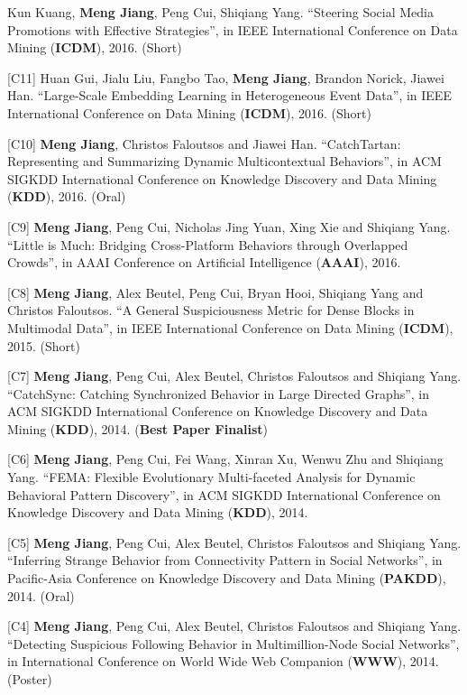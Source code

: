 \documentclass[margin, 9pt]{res}
\begin{document}
\begin{resume}
[C12] Kun Kuang, \textbf{Meng Jiang}, Peng Cui, Shiqiang Yang. ``Steering Social Media Promotions with Effective Strategies'', in IEEE International Conference on Data Mining (\textbf{ICDM}), 2016. (Short)

[C11] Huan Gui, Jialu Liu, Fangbo Tao, \textbf{Meng Jiang}, Brandon Norick, Jiawei Han. ``Large-Scale Embedding Learning in Heterogeneous Event Data'', in IEEE International Conference on Data Mining (\textbf{ICDM}), 2016. (Short)

[C10] \textbf{Meng Jiang}, Christos Faloutsos and Jiawei Han. ``CatchTartan: Representing and Summarizing Dynamic Multicontextual Behaviors'', in ACM SIGKDD International Conference on Knowledge Discovery and Data Mining (\textbf{KDD}), 2016. (Oral)

[C9] \textbf{Meng Jiang}, Peng Cui, Nicholas Jing Yuan, Xing Xie and Shiqiang Yang. ``Little is Much: Bridging Cross-Platform Behaviors through Overlapped Crowds'', in AAAI Conference on Artificial Intelligence (\textbf{AAAI}), 2016.

[C8] \textbf{Meng Jiang}, Alex Beutel, Peng Cui, Bryan Hooi, Shiqiang Yang and Christos Faloutsos. ``A General Suspiciousness Metric for Dense Blocks in Multimodal Data'', in IEEE International Conference on Data Mining (\textbf{ICDM}), 2015. (Short)

[C7] \textbf{Meng Jiang}, Peng Cui, Alex Beutel, Christos Faloutsos and Shiqiang Yang. ``CatchSync: Catching Synchronized Behavior in Large Directed Graphs'', in ACM SIGKDD International Conference on Knowledge Discovery and Data Mining (\textbf{KDD}), 2014. (\textbf{Best Paper Finalist})

[C6] \textbf{Meng Jiang}, Peng Cui, Fei Wang, Xinran Xu, Wenwu Zhu and Shiqiang Yang. ``FEMA: Flexible Evolutionary Multi-faceted Analysis for Dynamic Behavioral Pattern Discovery'', in ACM SIGKDD International Conference on Knowledge Discovery and Data Mining (\textbf{KDD}), 2014.

[C5] \textbf{Meng Jiang}, Peng Cui, Alex Beutel, Christos Faloutsos and Shiqiang Yang. ``Inferring Strange Behavior from Connectivity Pattern in Social Networks'', in Pacific-Asia Conference on Knowledge Discovery and Data Mining (\textbf{PAKDD}), 2014. (Oral)

[C4] \textbf{Meng Jiang}, Peng Cui, Alex Beutel, Christos Faloutsos and Shiqiang Yang. ``Detecting Suspicious Following Behavior in Multimillion-Node Social Networks'', in International Conference on World Wide Web Companion (\textbf{WWW}), 2014. (Poster)


\end{resume}
\end{document}
